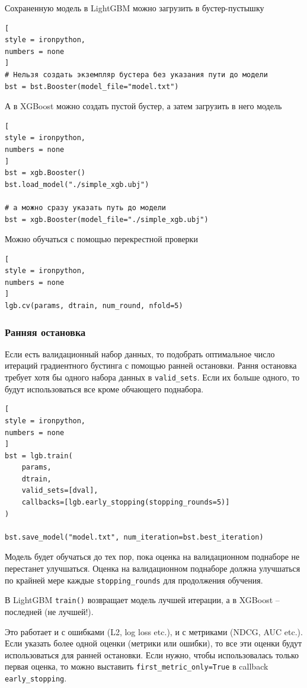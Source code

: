 \documentclass[%
	11pt,
	a4paper,
	utf8,
		]{article}
\begin{document}
Сохраненную модель в LightGBM можно загрузить в бустер-пустышку
\begin{lstlisting}[
style = ironpython,
numbers = none
]
# Нельзя создать экземпляр бустера без указания пути до модели
bst = bst.Booster(model_file="model.txt")
\end{lstlisting}

А в XGBoost можно создать пустой бустер, а затем загрузить в него модель
\begin{lstlisting}[
style = ironpython,
numbers = none
]
bst = xgb.Booster()
bst.load_model("./simple_xgb.ubj")

# а можно сразу указать путь до модели
bst = xgb.Booster(model_file="./simple_xgb.ubj")
\end{lstlisting}

Можно обучаться с помощью перекрестной проверки
\begin{lstlisting}[
style = ironpython,
numbers = none
]
lgb.cv(params, dtrain, num_round, nfold=5)
\end{lstlisting}

\subsubsection{Ранняя остановка}

Если есть валидационный набор данных, то подобрать оптимальное число итераций градиентного бустинга с помощью ранней остановки. Рання остановка требует хотя бы одного набора данных в \verb|valid_sets|. Если их больше одного, то будут использоваться все кроме обчающего поднабора.
\begin{lstlisting}[
style = ironpython,
numbers = none
]
bst = lgb.train(
    params,
    dtrain,
    valid_sets=[dval],
    callbacks=[lgb.early_stopping(stopping_rounds=5)]
)

bst.save_model("model.txt", num_iteration=bst.best_iteration)
\end{lstlisting}

Модель будет обучаться до тех пор, пока оценка на валидационном поднаборе не перестанет улучшаться. Оценка на валидационном поднаборе должна улучшаться по крайней мере каждые \verb|stopping_rounds| для продолжения обучения.

В LightGBM \verb|train()| возвращает модель лучшей итерации, а в XGBoost -- последней (не лучшей!).

Это работает и с ошибками (L2, log loss etc.), и с метриками (NDCG, AUC etc.). Если указать более одной оценки (метрики или ошибки), то все эти оценки будут использоваться для ранней остановки. Если нужно, чтобы использовалась только первая оценка, то можно выставить \verb|first_metric_only=True| в callback \verb|early_stopping|.
\end{document}
